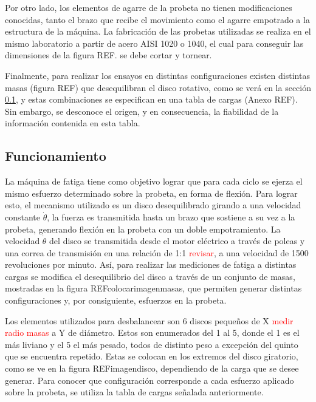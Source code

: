Por otro lado, los elementos de agarre de la probeta no tienen modificaciones conocidas, tanto el brazo que recibe el movimiento como el agarre empotrado a la estructura de la máquina. La fabricación de las probetas utilizadas se realiza en el mismo laboratorio a partir de acero AISI 1020 o 1040, el cual para conseguir las dimensiones de la figura REF. se debe cortar y tornear.

Finalmente, para realizar los ensayos en distintas configuraciones existen distintas masas (figura REF) que desequilibran el disco rotativo, como se verá en la sección \ref{sec:funcionamiento}, y estas combinaciones se especifican en una tabla de cargas (Anexo REF). Sin embargo, se desconoce el origen, y en consecuencia, la fiabilidad de la información contenida en esta tabla.

\subsection{Funcionamiento}
\label{sec:funcionamiento}
La máquina de fatiga tiene como objetivo lograr que para cada ciclo se ejerza el mismo esfuerzo determinado sobre la probeta, en forma de flexión. Para lograr esto, el mecanismo utilizado es un disco desequilibrado girando a una velocidad constante $\dot{\theta}$, la fuerza es transmitida hasta un brazo que sostiene a su vez a la probeta, generando flexión en la probeta con un doble empotramiento. La velocidad $\dot{\theta}$ del disco se transmitida desde el motor eléctrico a través de poleas y una correa de transmisión en una relación de 1:1 \textcolor{red}{revisar}, a una velocidad de 1500 revoluciones por minuto. Así, para realizar las mediciones de fatiga a distintas cargas se modifica el desequilibrio del disco a través de un conjunto de masas, mostradas en la figura REFcolocarimagenmasas, que permiten generar distintas configuraciones y, por consiguiente, esfuerzos en la probeta. 

Los elementos utilizados para desbalancear son 6 discos pequeños de X \textcolor{red}{medir radio masas} a Y de diámetro. Estos son enumerados del 1 al 5, donde el 1 es el más liviano y el 5 el más pesado, todos de distinto peso a excepción del quinto que se encuentra repetido. Estas se colocan en los extremos del disco giratorio, como se ve en la figura REFimagendisco, dependiendo de la carga que se desee generar. Para conocer que configuración corresponde a cada esfuerzo aplicado sobre la probeta, se utiliza la tabla de cargas señalada anteriormente.

